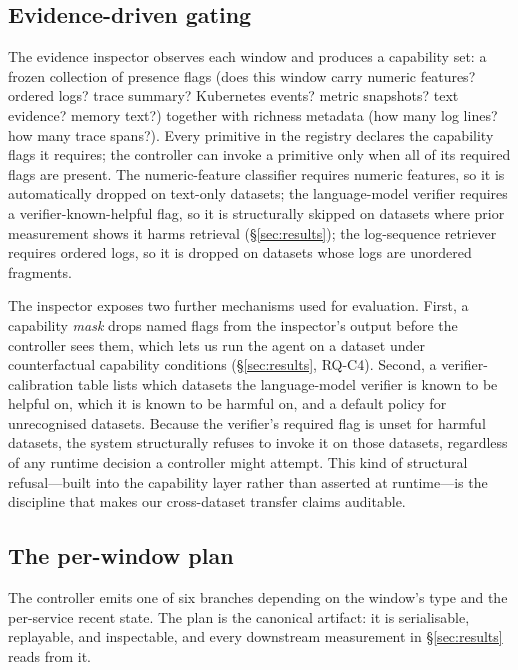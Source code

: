 \subsection{Evidence-driven gating}
\label{sec:approach:gating}

The evidence inspector observes each window and produces a capability set: a frozen collection of presence flags (does this window carry numeric features? ordered logs? trace summary? Kubernetes events? metric snapshots? text evidence? memory text?) together with richness metadata (how many log lines? how many trace spans?). Every primitive in the registry declares the capability flags it requires; the controller can invoke a primitive only when all of its required flags are present. The numeric-feature classifier requires numeric features, so it is automatically dropped on text-only datasets; the language-model verifier requires a verifier-known-helpful flag, so it is structurally skipped on datasets where prior measurement shows it harms retrieval (\S\ref{sec:results}); the log-sequence retriever requires ordered logs, so it is dropped on datasets whose logs are unordered fragments.

The inspector exposes two further mechanisms used for evaluation. First, a capability \emph{mask} drops named flags from the inspector's output before the controller sees them, which lets us run the agent on a dataset under counterfactual capability conditions (\S\ref{sec:results}, RQ-C4). Second, a verifier-calibration table lists which datasets the language-model verifier is known to be helpful on, which it is known to be harmful on, and a default policy for unrecognised datasets. Because the verifier's required flag is unset for harmful datasets, the system structurally refuses to invoke it on those datasets, regardless of any runtime decision a controller might attempt. This kind of structural refusal---built into the capability layer rather than asserted at runtime---is the discipline that makes our cross-dataset transfer claims auditable.

\subsection{The per-window plan}
\label{sec:approach:plan}

The controller emits one of six branches depending on the window's type and the per-service recent state. The plan is the canonical artifact: it is serialisable, replayable, and inspectable, and every downstream measurement in \S\ref{sec:results} reads from it.


